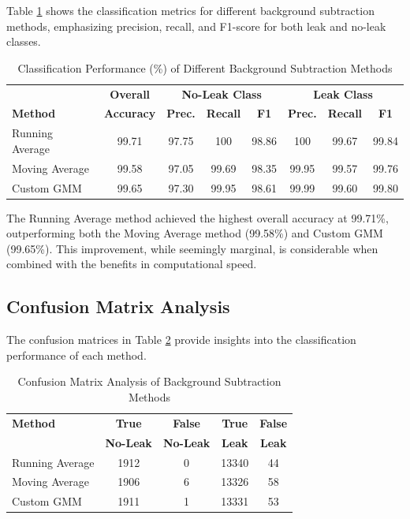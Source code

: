 Table \ref{tab:classification_performance} shows the classification metrics for different background subtraction methods, emphasizing precision, recall, and F1-score for both leak and no-leak classes.

\begin{table}[htbp]
\caption{Classification Performance (\%) of Different Background Subtraction Methods}
\label{tab:classification_performance}
\begin{tabular}{|l|c|c|c|c|c|c|c|}
\hline
& \textbf{Overall} & \multicolumn{3}{c|}{\textbf{No-Leak Class}} & \multicolumn{3}{c|}{\textbf{Leak Class}} \\
\cline{3-8}
\textbf{Method} & \textbf{Accuracy} & \textbf{Prec.} & \textbf{Recall} & \textbf{F1} & \textbf{Prec.} & \textbf{Recall} & \textbf{F1} \\
\hline
Running Average & 99.71 & 97.75 & 100 & 98.86 & 100 & 99.67 & 99.84 \\
\hline
Moving Average & 99.58 & 97.05 & 99.69 & 98.35 & 99.95 & 99.57 & 99.76 \\
\hline
Custom GMM & 99.65 & 97.30 & 99.95 & 98.61 & 99.99 & 99.60 & 99.80 \\
\hline
\end{tabular}
\end{table}

The Running Average method achieved the highest overall accuracy at 99.71\%, outperforming both the Moving Average method (99.58\%) and Custom GMM (99.65\%). This improvement, while seemingly marginal, is considerable when combined with the benefits in computational speed.

\subsection{Confusion Matrix Analysis}

The confusion matrices in Table \ref{tab:confusion_matrix} provide insights into the classification performance of each method.

\begin{table}[htbp]
\caption{Confusion Matrix Analysis of Background Subtraction Methods}
\label{tab:confusion_matrix}
\begin{tabular}{|l|c|c|c|c|}
\hline
\textbf{Method} & \textbf{True} & \textbf{False} & \textbf{True} & \textbf{False} \\
& \textbf{No-Leak} & \textbf{No-Leak} & \textbf{Leak} & \textbf{Leak} \\
\hline
Running Average & 1912 & 0 & 13340 & 44 \\
\hline
Moving Average & 1906 & 6 & 13326 & 58 \\
\hline
Custom GMM & 1911 & 1 & 13331 & 53 \\
\hline
\end{tabular}
\end{table}

